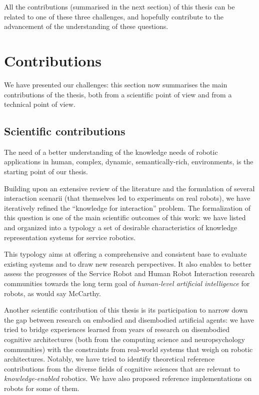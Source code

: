 All the contributions (summarised in the next section) of this thesis can be
related to one of these three challenges, and hopefully contribute to the
advancement of the understanding of these questions.



\section{Contributions}
\label{sect|contributions}

We have presented our challenges: this section now summarises the main
contributions of the thesis, both from a scientific point of view and from a
technical point of view.

\subsection{Scientific contributions}
\label{sect|scientific-contributions}

The need of a better understanding of the knowledge needs of robotic
applications in human, \ie complex, dynamic, semantically-rich, environments,
is the starting point of our thesis.

Building upon an extensive review of the literature and the formulation of
several interaction scenarii (that themselves led to experiments on real
robots), we have iteratively refined the ``knowledge for interaction'' problem.
The formalization of this question is one of the main scientific outcomes of
this work: we have listed and organized into a typology a set of desirable
characteristics of knowledge representation systems for service robotics.

This typology aims at offering a comprehensive and consistent base to evaluate
existing systems and to draw new research perspectives. It also enables to
better assess the progresses of the Service Robot and Human Robot Interaction
research communities towards the long term goal of \emph{human-level artificial
intelligence} for robots, as would say McCarthy.

Another scientific contribution of this thesis is its participation to
narrow down the gap between research on embodied and disembodied artificial
agents: we have tried to bridge experiences learned from years of research on
disembodied cognitive architectures (both from the computing science and
neuropsychology communities) with the constraints from real-world systems that
weigh on robotic architectures. Notably, we have tried to identify
theoretical reference contributions from the diverse fields of cognitive
sciences that are relevant to \emph{knowledge-enabled} robotics. We have also
proposed reference implementations on robots for some of them.

